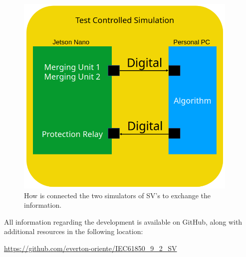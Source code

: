 \begin{figure}[tbh]
	\centering
	\includegraphics[width=0.95\textwidth, keepaspectratio]{ch4/assets/test_setup.png}
	\caption{How is connected the two simulators of SV's to exchange the information.}
	\label{fig:test_setup}
\end{figure}
\FloatBarrier

All information regarding the development is available on GitHub, along with additional resources in the following location:

\hspace{1cm} \url{https://github.com/everton-oriente/IEC61850_9_2_SV}



